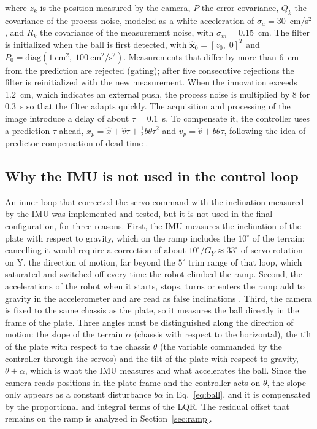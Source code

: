 \documentclass[11pt,letterpaper]{article}
\begin{document}
where $z_k$ is the position measured by the camera, $P$ the error
covariance, $Q_k$ the covariance of the process noise, modeled as a
white acceleration of $\sigma_a=30$~cm/s$^2$, and $R_k$ the covariance
of the measurement noise, with $\sigma_m=0.15$~cm. The filter is
initialized when the ball is first detected, with
$\hat{\mathbf{x}}_0=[z_0,\;0]^T$ and
$P_0=\mathrm{diag}(1~\mathrm{cm}^2,\;100~\mathrm{cm^2/s^2})$.
Measurements that differ by more than 6~cm from the
prediction are rejected (gating); after five consecutive rejections
the filter is reinitialized with the new measurement. When the innovation exceeds 1.2~cm,
which indicates an external push, the process noise is multiplied by 8
for 0.3~s so that the filter adapts quickly. The acquisition and
processing of the image introduce a delay of about $\tau=0.1$~s. To
compensate it, the controller uses a prediction $\tau$ ahead,
$x_p=\hat x+\hat v\tau+\tfrac12 b\theta\tau^2$ and $v_p=\hat
v+b\theta\tau$, following the idea of predictor compensation of dead
time \cite{Smith1957}.

\subsection{Why the IMU is not used in the control loop}
\label{sec:imu}
An inner loop that corrected the servo command with the inclination
measured by the IMU was implemented and tested, but it is not used in
the final configuration, for three reasons. First, the IMU measures the
inclination of the plate with respect to gravity, which on the ramp
includes the $10^\circ$ of the terrain; cancelling it would require a
correction of about $10^\circ/G_Y\approx33^\circ$ of servo rotation on
Y, the direction of motion, far beyond the $5^\circ$ trim range of that
loop, which saturated and switched off every time the robot climbed the
ramp. Second, the
accelerations of the robot when it starts, stops, turns or enters the
ramp add to gravity in the accelerometer and are read as false
inclinations \cite{Pedley2013}. Third, the camera is fixed to the same
chassis as the plate, so it measures the ball directly in the frame of
the plate. Three angles must be distinguished along the direction of
motion: the slope of the terrain $\alpha$ (chassis with respect to the
horizontal), the tilt of the plate with respect to the chassis $\theta$
(the variable commanded by the controller through the servos) and the
tilt of the plate with respect to gravity, $\theta+\alpha$, which is
what the IMU measures and what accelerates the ball. Since the camera
reads positions in the plate frame and the controller acts on $\theta$,
the slope only appears as a constant disturbance $b\alpha$
in Eq.~\eqref{eq:ball}, and it is
compensated by the proportional and integral terms of the LQR. The
residual offset that remains on the ramp is analyzed in
Section~\ref{sec:ramp}.
\end{document}
